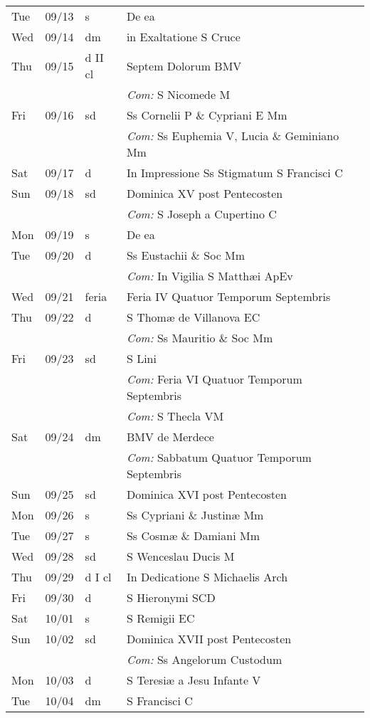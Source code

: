 \documentclass[10pt]{article}
\begin{document}
\begin{longtable}{ l l l l }
Tue & 09/13 & s & De ea\\
Wed & 09/14 & dm & in Exaltatione S Cruce\\
Thu & 09/15 & d II cl & Septem Dolorum BMV\\
 & & & \textit{Com:} S Nicomede M\\
Fri & 09/16 & sd & Ss Cornelii P \& Cypriani E Mm\\
 & & & \textit{Com:} Ss Euphemia V, Lucia \& Geminiano Mm\\
Sat & 09/17 & d & In Impressione Ss Stigmatum S Francisci C\\
Sun & 09/18 & sd & Dominica XV post Pentecosten\\
 & & & \textit{Com:} S Joseph a Cupertino C\\
Mon & 09/19 & s & De ea\\
Tue & 09/20 & d & Ss Eustachii \& Soc Mm\\
 & & & \textit{Com:} In Vigilia S Matthæi ApEv\\
Wed & 09/21 & feria & Feria IV Quatuor Temporum Septembris\\
Thu & 09/22 & d & S Thomæ de Villanova EC\\
 & & & \textit{Com:} Ss Mauritio \& Soc Mm\\
Fri & 09/23 & sd & S Lini\\
 & & & \textit{Com:} Feria VI Quatuor Temporum Septembris\\
 & & & \textit{Com:} S Thecla VM\\
Sat & 09/24 & dm & BMV de Merdece\\
 & & & \textit{Com:} Sabbatum Quatuor Temporum Septembris\\
Sun & 09/25 & sd & Dominica XVI post Pentecosten\\
Mon & 09/26 & s & Ss Cypriani \& Justinæ Mm\\
Tue & 09/27 & s & Ss Cosmæ \& Damiani Mm\\
Wed & 09/28 & sd & S Wenceslau Ducis M\\
Thu & 09/29 & d I cl & In Dedicatione S Michaelis Arch\\
Fri & 09/30 & d & S Hieronymi SCD\\
Sat & 10/01 & s & S Remigii EC\\
Sun & 10/02 & sd & Dominica XVII post Pentecosten\\
 & & & \textit{Com:} Ss Angelorum Custodum\\
Mon & 10/03 & d & S Teresiæ a Jesu Infante V\\
Tue & 10/04 & dm & S Francisci C\\

\end{longtable}
\end{document}
